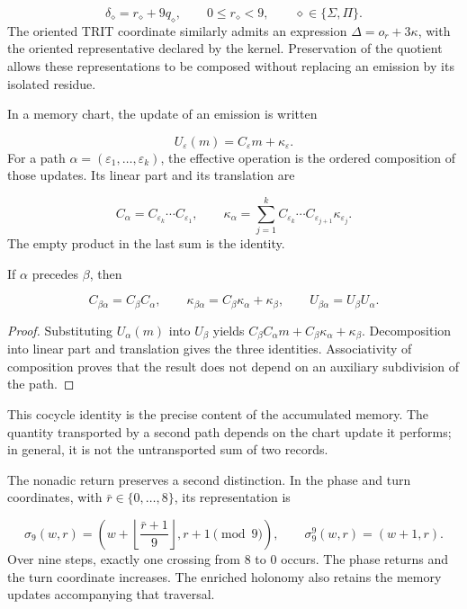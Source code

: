 \[
\delta_\diamond=r_\diamond+9q_\diamond,
\qquad 0\leq r_\diamond<9,
\qquad \diamond\in\{\Sigma,\Pi\}.
\]
The oriented TRIT coordinate similarly admits an expression \(\Delta=o_r+3\kappa\), with the oriented representative declared by the kernel. Preservation of the quotient allows these representations to be composed without replacing an emission by its isolated residue.

In a memory chart, the update of an emission is written

\[
U_\varepsilon(m)=C_\varepsilon m+\kappa_\varepsilon.
\]
For a path \(\alpha=(\varepsilon_1,\ldots,\varepsilon_k)\), the effective operation is the ordered composition of those updates. Its linear part and its translation are

\[
C_\alpha=C_{\varepsilon_k}\cdots C_{\varepsilon_1},
\qquad
\kappa_\alpha=
\sum_{j=1}^{k}C_{\varepsilon_k}\cdots
C_{\varepsilon_{j+1}}\kappa_{\varepsilon_j}.
\]
The empty product in the last sum is the identity.

\begin{proposition}
\label{prop:continuo-compatibilidad-afin}
If \(\alpha\) precedes \(\beta\), then

\[
C_{\beta\alpha}=C_\beta C_\alpha,
\qquad
\kappa_{\beta\alpha}=C_\beta\kappa_\alpha+\kappa_\beta,
\qquad
U_{\beta\alpha}=U_\beta U_\alpha.
\]
\end{proposition}
\begin{proof}
Substituting \(U_\alpha(m)\) into \(U_\beta\) yields \(C_\beta C_\alpha m+C_\beta\kappa_\alpha+\kappa_\beta\). Decomposition into linear part and translation gives the three identities. Associativity of composition proves that the result does not depend on an auxiliary subdivision of the path.
\end{proof}

This cocycle identity is the precise content of the accumulated memory. The quantity transported by a second path depends on the chart update it performs; in general, it is not the untransported sum of two records.

The nonadic return preserves a second distinction. In the phase and turn coordinates, with \(\bar r\in\{0,\ldots,8\}\), its representation is

\[
\sigma_9(w,r)=
\left(w+\left\lfloor\frac{\bar r+1}{9}\right\rfloor,
r+1\pmod9\right),
\qquad
\sigma_9^9(w,r)=(w+1,r).
\]
Over nine steps, exactly one crossing from \(8\) to \(0\) occurs. The phase returns and the turn coordinate increases. The enriched holonomy also retains the memory updates accompanying that traversal.

